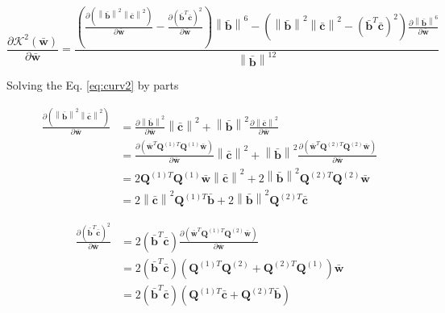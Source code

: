 \begin{equation}\label{eq:curv2}
\frac{
\partial 
\mathcal{K}^{2}(\mathbf{\bar{w}})
}
{
\partial \mathbf{\bar{w}}
}
=
\frac{
\left(
\frac{
\partial 
\left(
\left\|\mathbf{\bar{b}}\right\|^2
\left\|\mathbf{\bar{c}}\right\|^2
\right)
}
{\partial \mathbf{\bar{w}}}
-
\frac{
\partial
\left(
\mathbf{\bar{b}}^{T}
\mathbf{\bar{c}}
\right)^{2}
}
{\partial \mathbf{\bar{w}}}
\right)
\left\| \mathbf{\bar{b}} \right\|^{6}
-
\left(
\left\|
\mathbf{\bar{b}} 
\right\|^{2}
\left\|
\mathbf{\bar{c}}
\right\|^{2}
-
\left(
\mathbf{\bar{b}}^{T}
\mathbf{\bar{c}}
\right)^{2}
\right)
\frac{
\partial
\left\| \mathbf{\bar{b}} \right\|^{6}
}
{
\partial \mathbf{\bar{w}}
}
}
{\left\| \mathbf{\bar{b}} \right\|^{12}}
\end{equation}

Solving \cite[pp. 11]{petersen2008matrix} the Eq. \ref{eq:curv2} by parts

\begin{align}
\frac{
\partial 
\left(
\left\|\mathbf{\bar{b}}\right\|^2
\left\|\mathbf{\bar{c}}\right\|^2
\right)
}
{\partial \mathbf{\bar{w}}}
&=
\frac{
\partial 
\left\|\mathbf{\bar{b}}\right\|^2
}
{\partial \mathbf{\bar{w}}}
\left\|\mathbf{\bar{c}}\right\|^2
+
\left\|\mathbf{\bar{b}}\right\|^2
\frac{
\partial 
\left\|\mathbf{\bar{c}}\right\|^2
}
{\partial \mathbf{\bar{w}}}\\
~
&=
\frac{
\partial 
\left(
\mathbf{\bar{w}}^{T} \mathbf{Q}^{(1)T}
\mathbf{Q}^{(1)} \mathbf{\bar{w}}
\right)
}
{\partial \mathbf{\bar{w}}}
\left\|\mathbf{\bar{c}}\right\|^2
+
\left\|\mathbf{\bar{b}}\right\|^2
\frac{
\partial 
\left(
\mathbf{\bar{w}}^{T} \mathbf{Q}^{(2)T}
\mathbf{Q}^{(2)} \mathbf{\bar{w}}
\right)
}
{\partial \mathbf{\bar{w}}}\\
~
&=
2
\mathbf{Q}^{(1)T} \mathbf{Q}^{(1)} \mathbf{\bar{w}}
\left\|\mathbf{\bar{c}}\right\|^2
+
2
\left\|\mathbf{\bar{b}}\right\|^2
\mathbf{Q}^{(2)T} \mathbf{Q}^{(2)} \mathbf{\bar{w}}\\
~
&=
2
\left\|\mathbf{\bar{c}}\right\|^2
\mathbf{Q}^{(1)T} \mathbf{\bar{b}}
+
2
\left\|\mathbf{\bar{b}}\right\|^2
\mathbf{Q}^{(2)T} \mathbf{\bar{c}}
\end{align}

\begin{align}
\frac{
\partial
\left(
\mathbf{\bar{b}}^{T}
\mathbf{\bar{c}}
\right)^{2}
}
{\partial \mathbf{\bar{w}}} 
&=
2
\left(
\mathbf{\bar{b}}^{T}
\mathbf{\bar{c}}
\right)
\frac{
\partial
\left(
\mathbf{\bar{w}}^{T} \mathbf{Q}^{(1)T}
\mathbf{Q}^{(2)} \mathbf{\bar{w}}
\right)
}
{\partial \mathbf{\bar{w}}}\\
~
&=
2
\left(
\mathbf{\bar{b}}^{T}
\mathbf{\bar{c}}
\right)
\left(
\mathbf{Q}^{(1)T}\mathbf{Q}^{(2)}
+
\mathbf{Q}^{(2)T}\mathbf{Q}^{(1)}
\right)
\mathbf{\bar{w}}\\
~
&=
2
\left(
\mathbf{\bar{b}}^{T}
\mathbf{\bar{c}}
\right)
\left(
\mathbf{Q}^{(1)T}\mathbf{\bar{c}}
+
\mathbf{Q}^{(2)T}\mathbf{\bar{b}}
\right)
\end{align}


